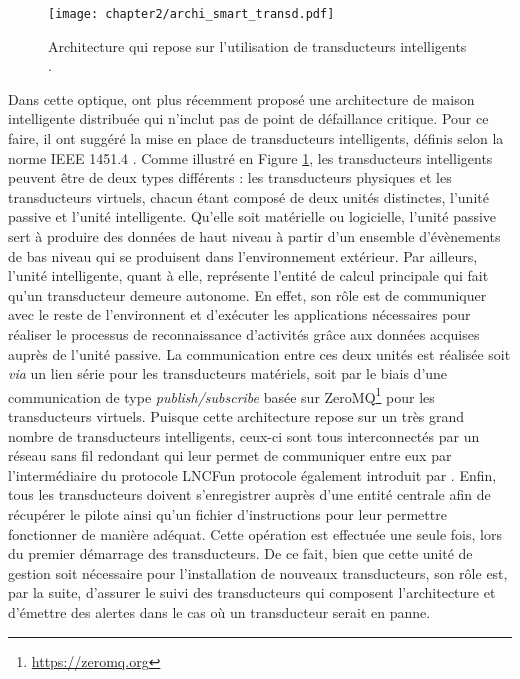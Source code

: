 \begin{figure}[ht!]
	\centering
	\texttt{[image: chapter2/archi\_smart\_transd.pdf]}
	\caption[Architecture qui repose sur l'utilisation de transducteurs intelligents.]{Architecture qui repose sur l'utilisation de transducteurs intelligents \citep{Plantevin2018}.}
	\label{fig:archi_smart_transd}
\end{figure}

Dans cette optique, \cite{Plantevin2018} ont plus récemment proposé une architecture de maison intelligente distribuée qui n'inclut
pas de point de défaillance critique. Pour ce faire, il ont suggéré la mise en place de transducteurs intelligents, définis selon la norme IEEE 1451.4 \citep{InstituteofElectricalandElectronicsEngineers1999}. Comme illustré en Figure \ref{fig:archi_smart_transd}, les transducteurs intelligents peuvent être de deux types différents : les transducteurs physiques et les transducteurs virtuels, chacun étant composé de deux unités distinctes, l'unité passive et l'unité intelligente. Qu'elle soit matérielle ou logicielle, l'unité passive sert à produire des données de haut niveau à partir d'un ensemble d'évènements de bas niveau qui se produisent dans l'environnement extérieur. Par ailleurs, l'unité intelligente, quant à elle, représente l'entité de calcul principale qui fait qu'un transducteur demeure autonome. En effet, son rôle est de communiquer avec le reste de l'environnent et d'exécuter les applications nécessaires pour réaliser le processus de reconnaissance d'activités grâce aux données acquises auprès de l'unité passive. La communication entre ces deux unités est réalisée soit \textit{via} un lien série pour les transducteurs matériels, soit par le biais d'une communication de type \textit{publish/subscribe} basée sur ZeroMQ\footnote{\url{https://zeromq.org}} pour les transducteurs virtuels. Puisque cette architecture repose sur un très grand nombre de transducteurs intelligents, ceux-ci sont tous interconnectés par un réseau sans fil redondant qui leur permet de communiquer entre eux par l'intermédiaire du protocole \ac{LNCF}\textemdash un protocole également introduit par \cite{Plantevin2017}. Enfin, tous les transducteurs doivent s'enregistrer auprès d'une entité centrale afin de récupérer le pilote ainsi qu'un fichier d'instructions pour leur permettre fonctionner de manière adéquat. Cette opération est effectuée une seule fois, lors du premier démarrage des transducteurs. De ce fait, bien que cette unité de gestion soit nécessaire pour l'installation de nouveaux transducteurs, son rôle est, par la suite, d'assurer le suivi des transducteurs qui composent l'architecture et d'émettre des alertes dans le cas où un transducteur serait en panne.

